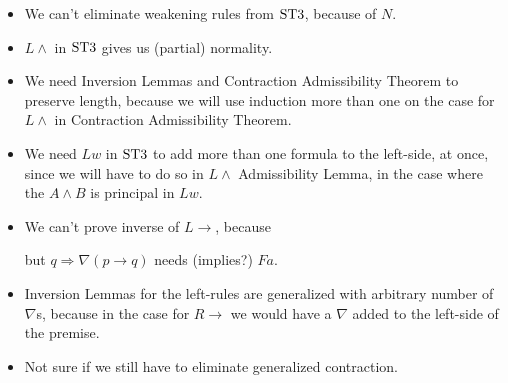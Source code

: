 \documentclass[a4paper, 12pt]{paper}
\begin{document}
\begin{itemize}
  \item We can't eliminate weakening rules from $\stt$, because of $N$.

  \item $L \wedge$ in $\stt$ gives us (partial) normality.
  
  \item We need Inversion Lemmas and Contraction Admissibility Theorem to preserve length, because we will use induction more than one on the case for $L \wedge$ in Contraction Admissibility Theorem.
  
  \item We need $Lw$ in $\stt$ to add more than one formula to the left-side, at once, since we will have to do so in $L \wedge$ Admissibility Lemma, in the case where the $A \wedge B$ is principal in $Lw$.
  
  \item We can't prove inverse of $L \rightarrow$, because
  \begin{prooftree}
  \end{prooftree}
  but $q \Rightarrow \nabla (p \rightarrow q)$ needs (implies?) $Fa$.

  \item Inversion Lemmas for the left-rules are generalized with arbitrary number of $\nabla$s, because in the case for $R \rightarrow$ we would have a $\nabla$ added to the left-side of the premise.
  
  \item Not sure if we still have to eliminate generalized contraction.
  
\end{itemize}
\end{document}
